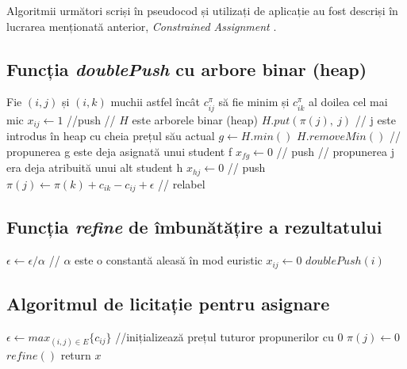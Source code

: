 Algoritmii următori scriși în pseudocod și utilizați de aplicație au fost descriși în lucrarea menționată anterior, \textit{Constrained Assignment} \cite{assignment}.

\subsection{Funcția \textit{doublePush} cu arbore binar (heap)}

\begin{algorithm}
	\caption{$doublePush(i)$}
	\begin{algorithmic}[1]
		\State Fie $(i, j)$ și $(i, k)$ muchii astfel încât $c_{ij}^\pi$ să fie minim și $c_{ik}^\pi$ al doilea cel mai mic
		\State $x_{ij} \gets 1$ //push 
		 // $H$ este arborele binar (heap)
			\State $H.put(\pi(j),\ j)$ // j este introdus în heap cu cheia prețul său actual
				\State $g \gets H.min()$
				\State $H.removeMin()$
				 // propunerea g este deja asignată unui student f
					\State $x_{fg} \gets 0$ // push
				\EndIf
			\EndIf
		\EndIf
		 // propunerea j era deja atribuită unui alt student h
			\State $x_{hj} \gets 0$ // push
		\EndIf
		\State $\pi(j) \gets \pi(k) + c_{ik} - c_{ij} + \epsilon$ // relabel
	\end{algorithmic}
\end{algorithm}

\subsection{Funcția \textit{refine} de îmbunătățire a rezultatului}

\begin{algorithm}
	\caption{$refine()$}
	\begin{algorithmic}[1]
		\State $\epsilon \gets \epsilon / \alpha$ // $\alpha$ este o constantă aleasă în mod euristic
			\State $x_{ij} \gets 0$
		\EndFor
			\State $doublePush(i)$
		\EndWhile
	\end{algorithmic}
\end{algorithm}

\subsection{Algoritmul de licitație pentru asignare}

\begin{algorithm}
	\caption{$solve()$}
	\begin{algorithmic}[1]
		\State $\epsilon \gets max_{(i, j) \in E}\{c_{ij}\}$
		 //inițializează prețul tuturor propunerilor cu 0
			\State $\pi(j) \gets 0$
		\EndFor
			\State $refine()$
		\EndWhile
		\State return $x$
	\end{algorithmic}
\end{algorithm}

